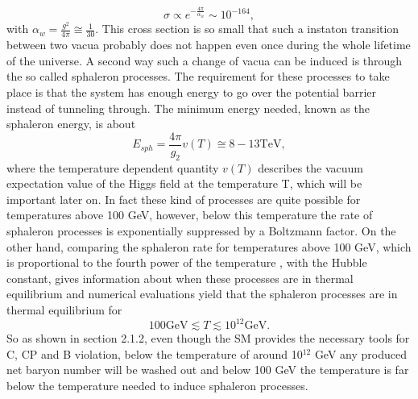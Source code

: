 \begin{equation}
	\sigma\propto e^{-\frac{4\pi}{\alpha_w}}\sim10^{-164},
	\label{eq:instaton_cross_section}
\end{equation}
with $\alpha_w=\frac{g^2}{4\pi}\cong\frac{1}{30}$.
This cross section is so small that such a instaton transition between two vacua probably does not happen even once during the whole lifetime of the universe. \newline\indent
A second way such a change of vacua can be induced is through the so called sphaleron processes. The requirement for these processes to take place is that the system has enough energy to go over the potential barrier instead of tunneling through. The minimum energy needed, known as the sphaleron energy, is about\cite{Cline:2006ts,Bernreuther:2002uj}
\begin{equation}
	E_{sph}=\frac{4\pi}{g_2}v(T)\cong8-13\text{TeV},
	\label{eq:sphaleron}
\end{equation} 
where the temperature dependent quantity $v(T)$ describes the vacuum expectation value of the Higgs field at the temperature T, which will be important later on.\newline\indent
In fact these kind of processes are quite possible for temperatures above 100 GeV, however, below this temperature the rate of sphaleron processes is exponentially suppressed by a Boltzmann factor. On the other hand, comparing the sphaleron rate for temperatures above 100 GeV, which is proportional to the fourth power of the temperature \cite[p. 19]{Bernreuther:2002uj}, with the Hubble constant, gives information about when these processes are in thermal equilibrium and numerical evaluations yield that the sphaleron processes are in thermal equilibrium for
\begin{equation*}
100\text{GeV}\lesssim T \lesssim 10^{12}\text{GeV}.
\end{equation*}
So as shown in section 2.1.2, even though the SM provides the necessary tools for C, CP and B violation, below the temperature of around 10$^{12}$ GeV any produced net baryon number will be washed out and below 100 GeV the temperature is far below the temperature needed to induce sphaleron processes. \newline\indent
